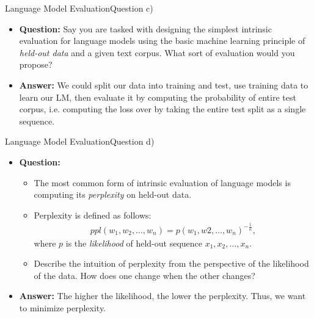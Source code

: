 \documentclass[t]{beamer}
\begin{document}
\begin{frame}{Language Model Evaluation}{Question c)}
    \begin{itemize}
        \item \textbf{Question:} Say you are tasked with designing the simplest
              intrinsic evaluation for language models using the basic machine
              learning principle of \emph{held-out data} and a given text
              corpus.
              What sort of evaluation would you propose?
              \pause
        \item \textbf{Answer:} We could split our data into training and test,
              use training data to learn our LM, then evaluate it by computing
              the probability of entire test corpus, i.e. computing the loss
              over by taking the entire test split as a single sequence.
    \end{itemize}
\end{frame}

\begin{frame}{Language Model Evaluation}{Question d)}
    \begin{itemize}
        \item \textbf{Question:}
              \begin{itemize}
                  \item The most common form of intrinsic evaluation of language
                        models is computing its \emph{perplexity} on held-out
                        data.
                  \item Perplexity is defined as follows:
                        \begin{align*}
                            ppl(w_1,w_2,\ldots,w_n) = p(w_1,w2,\ldots,w_n)^{-\frac{1}{n}},
                        \end{align*}
                        where $p$ is the \emph{likelihood} of held-out sequence
                        $x_1, x_2, \ldots, x_n$.
                  \item Describe the intuition of perplexity from the
                        perspective of the likelihood of the data. How does one
                        change when the other changes?
              \end{itemize}
              \pause
        \item \textbf{Answer:} The higher the likelihood, the lower the
              perplexity. Thus, we want to minimize perplexity.
    \end{itemize}
\end{frame}
\end{document}
